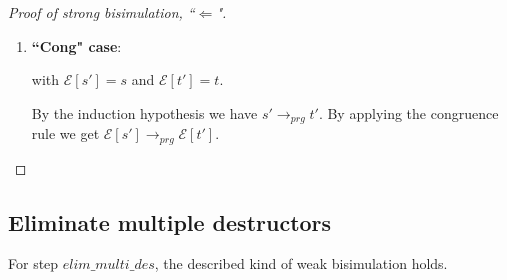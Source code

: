 \documentclass[11pt]{article} %
\begin{document}
\begin{proof}[Proof of strong bisimulation, ``$\Leftarrow$"]
\begin{enumerate}
\begin{itemize}
There is no conflict between the substitutions for, e.g., $x_1$ and $y_2$, since all variables that are substituted are distinct, as can be seen in the definition of $split$.

\end{itemize}

This concludes the proof for the ``Subst" case.

\item \textbf{``Cong" case}:

\begin{prooftree}
\end{prooftree}

with $\mathcal{E}[s'] = s$ and $\mathcal{E}[t'] = t$.

By the induction hypothesis we have $s' \longrightarrow_{prg} t'$. By applying the congruence rule we get $\mathcal{E}[s'] \longrightarrow_{prg} \mathcal{E}[t']$.

\end{enumerate}

\end{proof}

\subsection{Eliminate multiple destructors}

For step $elim\_multi\_des$, the described kind of weak bisimulation holds.
\end{document}
